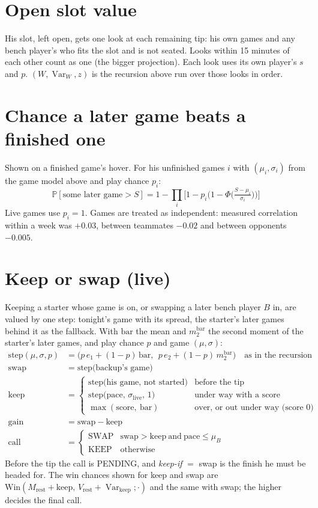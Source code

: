 \documentclass[10pt]{article}
\renewcommand{\Pr}{\mathbb{P}}
\DeclareMathOperator{\Var}{Var}
\begin{document}
\section{Open slot value}
His slot, left open, gets one look at each remaining tip: his own games and any bench player's who fits the slot and is not
seated. Looks within 15 minutes of each other count as one (the bigger projection). Each look uses its own player's
$s$ and $p$. $(W,\Var_W,z)$ is the recursion above run over those looks in order.

\section{Chance a later game beats a finished one}
Shown on a finished game's hover. For his unfinished games $i$ with $(\mu_i,\sigma_i)$ from the game model above and play chance $p_i$:
\begin{equation}
\Pr[\text{some later game}>S]=1-\prod_i\Big[1-p_i\big(1-\Phi\big(\tfrac{S-\mu_i}{\sigma_i}\big)\big)\Big]
\end{equation}
Live games use $p_i=1$. Games are treated as independent: measured correlation within a week was $+0.03$, between
teammates $-0.02$ and between opponents $-0.005$.

\section{Keep or swap (live)}
Keeping a starter whose game is on, or swapping a later bench player $B$ in, are valued by one step: tonight's game with
its spread, the starter's later games behind it as the fallback. With $\mathrm{bar}$ the mean and $m_2^{\text{bar}}$ the
second moment of the starter's later games, and play chance $p$ and game $(\mu,\sigma)$:
\begin{align}
\mathrm{step}(\mu,\sigma,p) &= \big(p\,e_1+(1-p)\,\mathrm{bar},\ \ p\,e_2+(1-p)\,m_2^{\text{bar}}\big)\quad\text{as in the recursion}\\
\text{swap} &= \mathrm{step}\big(\text{backup's game}\big)\\
\text{keep} &= \begin{cases}\mathrm{step}\big(\text{his game, not started}\big) & \text{before the tip}\\
\mathrm{step}\big(\text{pace},\,\sigma_{\text{live}},\,1\big) & \text{under way with a score}\\
\max(\text{score},\ \mathrm{bar}) & \text{over, or out under way (score }0)\end{cases}\\
\text{gain} &= \text{swap}-\text{keep}\\
\text{call} &= \begin{cases}\text{SWAP} & \text{swap}>\text{keep}\ \text{and}\ \text{pace}\le\mu_B\\ \text{KEEP}&\text{otherwise}\end{cases}
\end{align}
Before the tip the call is PENDING, and \emph{keep-if} $=$ swap is the finish he must be headed for. The win chances shown
for keep and swap are $\mathrm{Win}(M_{\text{rest}}+\text{keep},\,V_{\text{rest}}+\Var_{\text{keep}};\cdot)$ and the same with
swap; the higher decides the final call.
\end{document}
